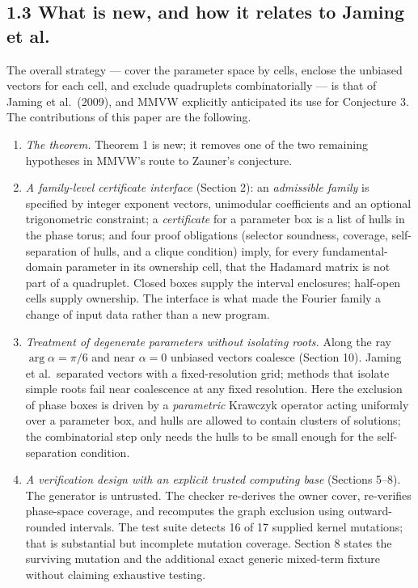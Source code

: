\documentclass[
  11pt,
]{article}
\providecommand{\tightlist}{%
  \setlength{\itemsep}{0pt}\setlength{\parskip}{0pt}}
\begin{document}
\subsection{1.3 What is new, and how it relates to Jaming et
al.}\label{what-is-new-and-how-it-relates-to-jaming-et-al.}

The overall strategy --- cover the parameter space by cells, enclose the
unbiased vectors for each cell, and exclude quadruplets combinatorially
--- is that of Jaming et al.~(2009), and MMVW explicitly anticipated its
use for Conjecture 3. The contributions of this paper are the following.

\begin{enumerate}
\def\labelenumi{\arabic{enumi}.}
\tightlist
\item
  \emph{The theorem.} Theorem 1 is new; it removes one of the two
  remaining hypotheses in MMVW's route to Zauner's conjecture.
\item
  \emph{A family-level certificate interface} (Section 2): an
  \emph{admissible family} is specified by integer exponent vectors,
  unimodular coefficients and an optional trigonometric constraint; a
  \emph{certificate} for a parameter box is a list of hulls in the phase
  torus; and four proof obligations (selector soundness, coverage,
  self-separation of hulls, and a clique condition) imply, for every
  fundamental-domain parameter in its ownership cell, that the Hadamard
  matrix is not part of a quadruplet. Closed boxes supply the interval
  enclosures; half-open cells supply ownership. The interface is what
  made the Fourier family a change of input data rather than a new
  program.
\item
  \emph{Treatment of degenerate parameters without isolating roots.}
  Along the ray \(\arg\alpha=\pi/6\) and near \(\alpha=0\) unbiased
  vectors coalesce (Section 10). Jaming et al.~separated vectors with a
  fixed-resolution grid; methods that isolate simple roots fail near
  coalescence at any fixed resolution. Here the exclusion of phase boxes
  is driven by a \emph{parametric} Krawczyk operator acting uniformly
  over a parameter box, and hulls are allowed to contain clusters of
  solutions; the combinatorial step only needs the hulls to be small
  enough for the self-separation condition.
\item
  \emph{A verification design with an explicit trusted computing base}
  (Sections 5--8). The generator is untrusted. The checker re-derives
  the owner cover, re-verifies phase-space coverage, and recomputes the
  graph exclusion using outward-rounded intervals. The test suite
  detects 16 of 17 supplied kernel mutations; that is substantial but
  incomplete mutation coverage. Section 8 states the surviving mutation
  and the additional exact generic mixed-term fixture without claiming
  exhaustive testing.
\end{enumerate}
\end{document}
